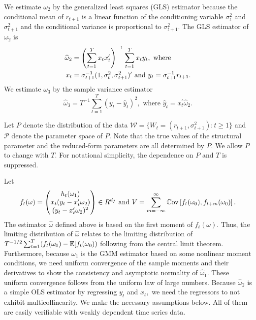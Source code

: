 \documentclass[11pt, letterpaper, twoside]{article}
\begin{document}
We estimate $\omega _{2}$ by the generalized least squares (GLS) estimator because the conditional mean of $r_{t+1}$ is a linear function of the conditioning variable $\sigma _{t}^{2}$ and $\sigma _{t+1}^{2}$ and the conditional variance is proportional to $\sigma _{t+1}^{2}.$ The GLS estimator of $\omega _{2}$ is
%
\begin{align}
    \widehat{\omega }_{2} &= \left( \sum_{t=1}^{T}x_{t}x_{t}^{\prime }\right) ^{-1}\sum_{t=1}^{T}x_{t}y_{t},\text{ where }  \notag \\ 
%
    x_{t} &= \sigma _{t+1}^{-1}(1,\sigma _{t}^{2},\sigma _{t+1}^{2})^{\prime } \text{ and }y_{t}=\sigma _{t+1}^{-1}r_{t+1}.  \label{omega 2 est}
\end{align}
%
We estimate $\omega _{3}$ by the sample variance estimator
%
\begin{equation}
    \widehat{\omega }_{3}=T^{-1}\sum_{t=1}^{T}\left( y_{t}-\widehat{y}_{t}\right) ^{2},\text{ where }\widehat{y}_{t}=x_{t}^{\prime }\widehat{ \omega }_{2}.  
    \label{omega 3 est}
\end{equation}

Let $P$ denote the distribution of the data $\mathcal{W}=\{W_{t}=(r_{t+1}, \sigma _{t+1}^{2}):t\geq 1\}$ and $\mathcal{P}$ denote the parameter space of $P$. Note that the true values of the structural parameter and the reduced-form parameters are all determined by $P.$ We allow $P$ to change with $T.$ For notational simplicity, the dependence on $P$ and $T$ is suppressed.

Let 
%
\begin{equation}
    f_{t}(\omega) = 
%
    \begin{pmatrix}
        h_{t}(\omega _{1}) \\ 
        x_{t}(y_{t}-x_{t}^{\prime }\omega _{2}) \\ 
        (y_{t}-x_{t}^{\prime }\omega _{2})^{2}%
    \end{pmatrix}
%
     \in R^{d_{f}}\text{ and } 
%
     V =\sum_{m=-\infty }^{\infty }\Cov\left[f_{t}(\omega _{0}),f_{t+m}(\omega _{0})\right].
\end{equation}
%
The estimator $\widehat{\omega }$ defined above is based on the first moment of $f_{t}(\omega ).$ Thus, the limiting distribution of $\widehat{\omega }$ relates to the limiting distribution of $T^{-1/2}\sum_{t=1}^{T}(f_{t}(\omega _{0})-\operatorname{\mathbb{E}}[f_{t}(\omega _{0}))$ following from the central limit theorem. Furthermore, because $\omega _{1}$ is the GMM estimator based on some nonlinear moment conditions, we need uniform convergence of the sample moments and their derivatives to show the consistency and asymptotic normality of $\widehat{\omega }_{1}.$ These uniform convergence follows from the uniform law of large numbers. Because $\widehat{\omega }_{2}$ is a simple OLS estimator by regressing $y_{t}$ and $x_{t},$ we need the regressors to not exhibit multicollinearity. We make the necessary assumptions below. All of them are easily verifiable with weakly dependent time series data.
\end{document}
